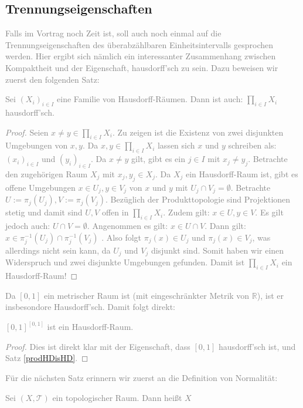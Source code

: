 \documentclass[11pt]{scrartcl}
\newcommand{\R}{\mathbb{R}}
\begin{document}
\subsection{Trennungseigenschaften}
\textcolor{gray}{
Falls im Vortrag noch Zeit ist, soll auch noch einmal auf die Trennungseigenschaften des überabzählbaren Einheitsintervalls gesprochen werden. Hier ergibt sich nämlich ein interessanter Zusammenhang
zwischen Kompaktheit und der Eigenschaft, hausdorff'sch zu sein. Dazu beweisen wir zuerst den folgenden Satz:
\begin{theorem}\label{prodHDisHD}
	Sei $(X_i)_{i\in I}$ eine Familie von Hausdorff-Räumen. Dann ist auch: $\prod_{i\in I} X_i$ hausdorff'sch.
\end{theorem}
\begin{proof}
	Seien $x\neq y \in \prod_{i\in I} X_i$. Zu zeigen ist die Existenz von zwei disjunkten Umgebungen von $x,y$. Da $x,y\in \prod_{i\in I} X_i$ lassen sich $x$ und $y$ schreiben als: $(x_i)_{i\in I}$ und
	$(y_i)_{i\in I}$. Da $x\neq y$ gilt, gibt es ein $j\in I$ mit $x_j \neq y_j$. Betrachte den zugehörigen Raum $X_j$ mit $x_j, y_j\in X_j$. Da $X_j$ ein Hausdorff-Raum ist, gibt es offene Umgebungen 
	$x\in U_j, y\in V_j$ von $x$ und $y$ mit $U_j \cap V_j = \emptyset$. Betrachte $U:=\pi_{j}(U_j), V:= \pi_{j}(V_j)$. Bezüglich der Produkttopologie sind Projektionen stetig und damit sind
	$U,V$ offen in $\prod_{i\in I}X_i$. Zudem gilt: $x\in U, y\in V$. Es gilt jedoch auch: $U\cap V = \emptyset$. Angenommen es gilt: $x\in U\cap V$. Dann gilt: $x\in \pi_{j}^{-1}(U_j)\cap \pi_{j}^{-1}(V_j)$
	. Also folgt $\pi_j(x)\in U_j$ und $\pi_j(x)\in V_j$, was allerdings nicht sein kann, da $U_j$ und $V_j$ disjunkt sind. Somit haben wir einen Widerspruch und zwei disjunkte Umgebungen gefunden.
	Damit ist $\prod_{i\in I}X_i$ ein Hausdorff-Raum!
\end{proof}
Da $[0,1]$ ein metrischer Raum ist (mit eingeschränkter Metrik von $\R$), ist er insbesondore Hausdorff'sch. Damit folgt direkt:
\begin{corollary}\label{GCisHD}
	$[0,1]^{[0,1]}$ ist ein Hausdorff-Raum.
\end{corollary}
\begin{proof}
	Dies ist direkt klar mit der Eigenschaft, dass $[0,1]$ hausdorff'sch ist, und Satz \ref{prodHDisHD}.
\end{proof}
Für die nächsten Satz erinnern wir zuerst an die Definition von Normalität:
\begin{definition}
	Sei $(X,\mathcal T)$ ein topologischer Raum. Dann heißt $X$ 

\end{definition}}
\end{document}
